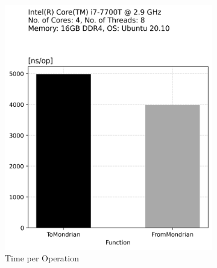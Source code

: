 \begin{figure}[t]
    \centering
    \begin{subfigure}[t]{.22\textwidth}
      \centering
      \includegraphics[width=\linewidth]{img/mondrian_transform_time.png}
      \caption{Time per Operation}
      \label{fig:sub: Time per Operation}
    \end{subfigure}\hfill%
    \begin{subfigure}[t]{.22\textwidth}
      \centering

\end{subfigure}
\end{figure}

